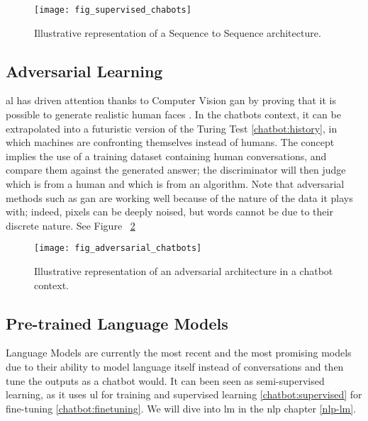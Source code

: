 \begin{figure}
    \centering
    \texttt{[image: fig\_supervised\_chabots]}
    \caption{Illustrative representation of a Sequence to Sequence architecture.}
    \label{fig:fig_supervised_chabots}
\end{figure}

\subsection{Adversarial Learning}
\label{chatbot:adversarial}
\gls{al} has driven attention thanks to Computer Vision \gls{gan} \autocite{paper:Karras2019stylegan2} by proving that it is possible to generate realistic human faces \autocite{website:person_does_not_exist}. In the chatbots context, it can be extrapolated into a futuristic version of the Turing Test \ref{chatbot:history}, in which machines are confronting themselves instead of humans. The concept implies the use of a training dataset containing human conversations, and compare them against the generated answer; the discriminator will then judge which is from a human and which is from an algorithm. Note that adversarial methods such as \gls{gan} are working well because of the nature of the data it plays with; indeed, pixels can be deeply noised, but words cannot be due to their discrete nature. See Figure ~\ref{fig:fig_adversarial_chatbots} 

\begin{figure}
    \centering
    \texttt{[image: fig\_adversarial\_chatbots]}
    \caption{Illustrative representation of an adversarial architecture in a chatbot context.}
    \label{fig:fig_adversarial_chatbots}
\end{figure}

\subsection{Pre-trained Language Models}
Language Models are currently the most recent and the most promising models due to their ability to model language itself instead of conversations and then tune the outputs as a chatbot would. It can been seen as semi-supervised learning, as it uses \gls{ul} for training and supervised learning \ref{chatbot:supervised} for fine-tuning \ref{chatbot:finetuning}. We will dive into \gls{lm} in the \gls{nlp} chapter \ref{nlp-lm}.

